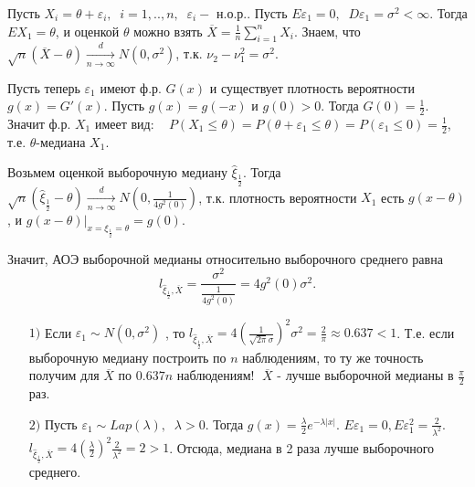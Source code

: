 \begin{example}[Важный]
	Пусть $\displaystyle X_i = \theta + \varepsilon_i, \;\; i=1,..,n,\;\; {\varepsilon_i}-\text{ н.о.р.}$. Пусть $\displaystyle E\varepsilon_1 = 0, \;\; D\varepsilon_1 = \sigma^2 < \infty$. Тогда $EX_1 = \theta$, и оценкой $\theta$ можно взять $\overline{X}= \frac{1}{n}\sum\limits_{i=1}^{n}X_i$. Знаем, что $\displaystyle \sqrt{n}(\overline{X}- \theta) \xrightarrow[n\to\infty]{d} N(0, \sigma^2)$, т.к. $\nu_2- \nu_1^2 = \sigma^2$.
\end{example}

Пусть теперь $\varepsilon_1$ имеют ф.р. $G(x)$ и существует плотность вероятности $g(x) = G'(x)$. Пусть $g(x) = g(-x)$ и $g(0)>0$. Тогда $G(0)=\frac{1}{2}$. Значит ф.р. $X_1$ имеет вид: $\displaystyle \;\;\; P(X_1 \leq \theta) = P(\theta+\varepsilon_1 \leq \theta) = P(\varepsilon_1 \leq 0) = \frac{1}{2}$, т.е. $\theta$-медиана $X_1$.

Возьмем оценкой выборочную медиану $\hat{\xi}_{\frac{1}{2}}$. Тогда 
$\displaystyle \sqrt{n}(\hat{\xi}_{\frac{1}{2}}-\theta)\xrightarrow[n\to\infty]{d}N\left(0,\frac{1}{4g^2(0)}\right)$, т.к. плотность вероятности $X_1$ есть $g(x-\theta)$, и $\displaystyle g(x-\theta)|_{x=\xi_{\frac{1}{2}}=\theta} = g(0)$.

Значит, АОЭ выборочной медианы относительно выборочного среднего равна 
\[l_{\hat{\xi}_{\frac{1}{2}}, \overline{X}}= \dfrac{\sigma^2}{\frac{1}{4g^2(0)}} = 4g^2(0)\sigma^2.\]
\begin{itemize}
	\item[$1)$] 
		Если $\varepsilon_1 \sim N(0, \sigma^2)$ , то
		$\displaystyle l_{\hat{\xi}_{\frac{1}{2}}, \overline{X}} = 4\left(\frac{1}{\sqrt{2\pi}\sigma}\right)^2\sigma^2= \frac{2}{\pi}\approx0.637<1$. Т.е. если выборочную медиану построить по $n$ наблюдениям, то ту же точность получим для $\overline{X}$ по $0.637n$ наблюдениям! $\; \overline{X}$ - лучше выборочной медианы в $\frac{\pi}{2}$ раз.
	\item[$2)$] 
		Пусть $\varepsilon_1 \sim Lap(\lambda), \;\; \lambda>0$. Тогда 
		$\displaystyle g(x) = \frac{\lambda}{2}e^{-\lambda|x|}$. $\displaystyle E\varepsilon_1 = 0, E\varepsilon_1^2 = \frac{2}{\lambda^2}$. $\displaystyle l_{\hat{\xi}_{\frac{1}{2}}, \overline{X}} = 4\left(\frac{\lambda}{2}\right)^2 \frac{2}{\lambda^2} = 2 > 1$.
		Отсюда, медиана в 2 раза лучше выборочного среднего.
\end{itemize}



